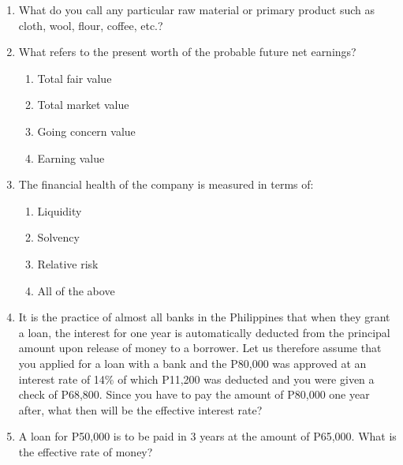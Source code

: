 \documentclass[11pt,a4paper]{article}
\begin{document}
\begin{enumerate}
\begin{enumerate}[label=\Alph*.]
\end{enumerate}
\item{What do you call any particular raw material or primary product such as cloth, wool, flour, coffee, etc.?}
\\
\item{What refers to the present worth of the probable future net earnings?}
\begin{enumerate}[label=\Alph*.]
\item{Total fair value}
\item{Total market value}
\item{Going concern value}
\item{Earning value}
\end{enumerate}
\item{The financial health of the company is measured in terms of:}
\begin{enumerate}[label=\Alph*.]
\item{Liquidity}
\item{Solvency}
\item{Relative risk}
\item{All of the above}
\end{enumerate}
\item{It is the practice of almost all banks in the Philippines that when they grant a loan, the interest for one year is automatically deducted from the principal amount upon release of money to a borrower. Let us therefore assume that you applied for a loan with a bank and the P80,000 was approved at an interest rate of 14\% of which P11,200 was deducted and you were given a check of P68,800. Since you have to pay the amount of P80,000 one year after, what then will be the effective interest rate?}
\\
\item{A loan for P50,000 is to be paid in 3 years at the amount of P65,000. What is the effective rate of money?}

\end{enumerate}
\end{document}
